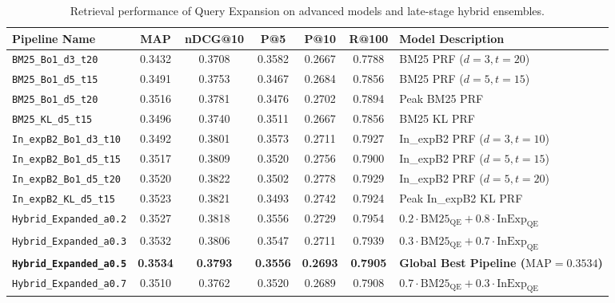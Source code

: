 \documentclass[10pt, a4paper]{article}
\begin{document}
\begin{table}[H]
\centering
\small
\begin{tabular}{@{}lcccccl@{}}
\toprule
\textbf{Pipeline Name} & \textbf{MAP} & \textbf{nDCG@10} & \textbf{P@5} & \textbf{P@10} & \textbf{R@100} & \textbf{Model Description} \\ \midrule
\texttt{BM25\_Bo1\_d3\_t20} & 0.3432 & 0.3708 & 0.3582 & 0.2667 & 0.7788 & BM25 PRF ($d=3, t=20$) \\
\texttt{BM25\_Bo1\_d5\_t15} & 0.3491 & 0.3753 & 0.3467 & 0.2684 & 0.7856 & BM25 PRF ($d=5, t=15$) \\
\texttt{BM25\_Bo1\_d5\_t20} & 0.3516 & 0.3781 & 0.3476 & 0.2702 & 0.7894 & Peak BM25 PRF \\
\texttt{BM25\_KL\_d5\_t15} & 0.3496 & 0.3740 & 0.3511 & 0.2667 & 0.7856 & BM25 KL PRF \\ \midrule
\texttt{In\_expB2\_Bo1\_d3\_t10} & 0.3492 & 0.3801 & 0.3573 & 0.2711 & 0.7927 & In\_expB2 PRF ($d=3, t=10$) \\
\texttt{In\_expB2\_Bo1\_d5\_t15} & 0.3517 & 0.3809 & 0.3520 & 0.2756 & 0.7900 & In\_expB2 PRF ($d=5, t=15$) \\
\texttt{In\_expB2\_Bo1\_d5\_t20} & 0.3520 & 0.3822 & 0.3502 & 0.2778 & 0.7929 & In\_expB2 PRF ($d=5, t=20$) \\
\texttt{In\_expB2\_KL\_d5\_t15} & 0.3523 & 0.3821 & 0.3493 & 0.2742 & 0.7924 & Peak In\_expB2 KL PRF \\ \midrule
\texttt{Hybrid\_Expanded\_a0.2} & 0.3527 & 0.3818 & 0.3556 & 0.2729 & 0.7954 & $0.2 \cdot \text{BM25}_{\text{QE}} + 0.8 \cdot \text{InExp}_{\text{QE}}$ \\
\texttt{Hybrid\_Expanded\_a0.3} & 0.3532 & 0.3806 & 0.3547 & 0.2711 & 0.7939 & $0.3 \cdot \text{BM25}_{\text{QE}} + 0.7 \cdot \text{InExp}_{\text{QE}}$ \\
\textbf{\texttt{Hybrid\_Expanded\_a0.5}} & \textbf{0.3534} & \textbf{0.3793} & \textbf{0.3556} & \textbf{0.2693} & \textbf{0.7905} & \textbf{Global Best Pipeline ($\text{MAP} = 0.3534$)} \\
\texttt{Hybrid\_Expanded\_a0.7} & 0.3510 & 0.3762 & 0.3520 & 0.2689 & 0.7908 & $0.7 \cdot \text{BM25}_{\text{QE}} + 0.3 \cdot \text{InExp}_{\text{QE}}$ \\ \bottomrule
\end{tabular}
\caption{Retrieval performance of Query Expansion on advanced models and late-stage hybrid ensembles.}
\label{tab:results_adv_qe}
\end{table}
\end{document}
